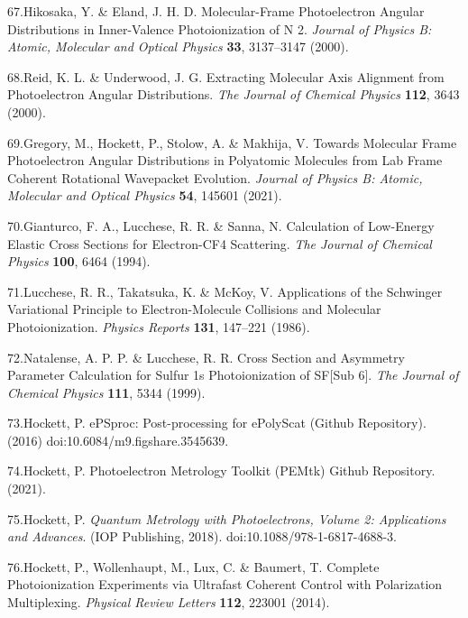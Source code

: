 \documentclass[10pt]{article}
\begin{document}
\label{csl:67}67.Hikosaka, Y. \& Eland, J. H. D. {Molecular-Frame Photoelectron Angular Distributions in Inner-Valence Photoionization of {{N}} 2}. \textit{Journal of Physics B: Atomic, Molecular and Optical Physics} \textbf{33}, 3137–3147 (2000).

\label{csl:68}68.Reid, K. L. \& Underwood, J. G. {Extracting Molecular Axis Alignment from Photoelectron Angular Distributions}. \textit{The Journal of Chemical Physics} \textbf{112}, 3643 (2000).

\label{csl:69}69.Gregory, M., Hockett, P., Stolow, A. \& Makhija, V. {Towards Molecular Frame Photoelectron Angular Distributions in Polyatomic Molecules from Lab Frame Coherent Rotational Wavepacket Evolution}. \textit{Journal of Physics B: Atomic, Molecular and Optical Physics} \textbf{54}, 145601 (2021).

\label{csl:70}70.Gianturco, F. A., Lucchese, R. R. \& Sanna, N. {Calculation of Low-Energy Elastic Cross Sections for Electron-{{CF4}} Scattering}. \textit{The Journal of Chemical Physics} \textbf{100}, 6464 (1994).

\label{csl:71}71.Lucchese, R. R., Takatsuka, K. \& McKoy, V. {Applications of the {{Schwinger}} Variational Principle to Electron-Molecule Collisions and Molecular Photoionization}. \textit{Physics Reports} \textbf{131}, 147–221 (1986).

\label{csl:72}72.Natalense, A. P. P. \& Lucchese, R. R. {Cross Section and Asymmetry Parameter Calculation for Sulfur 1s Photoionization of {{SF}}[Sub 6]}. \textit{The Journal of Chemical Physics} \textbf{111}, 5344 (1999).

\label{csl:73}73.Hockett, P. {{{ePSproc}}: {{Post-processing}} for {{ePolyScat}} ({{Github}} Repository)}. (2016) doi:10.6084/m9.figshare.3545639.

\label{csl:74}74.Hockett, P. {Photoelectron {{Metrology Toolkit}} ({{PEMtk}}) {{Github}} Repository}. (2021).

\label{csl:75}75.Hockett, P. \textit{{Quantum {{Metrology}} with {{Photoelectrons}}, {{Volume}} 2: {{Applications}} and Advances}}. ({IOP Publishing}, 2018). doi:10.1088/978-1-6817-4688-3.

\label{csl:76}76.Hockett, P., Wollenhaupt, M., Lux, C. \& Baumert, T. {Complete {{Photoionization Experiments}} via {{Ultrafast Coherent Control}} with {{Polarization Multiplexing}}}. \textit{Physical Review Letters} \textbf{112}, 223001 (2014).
\end{document}
